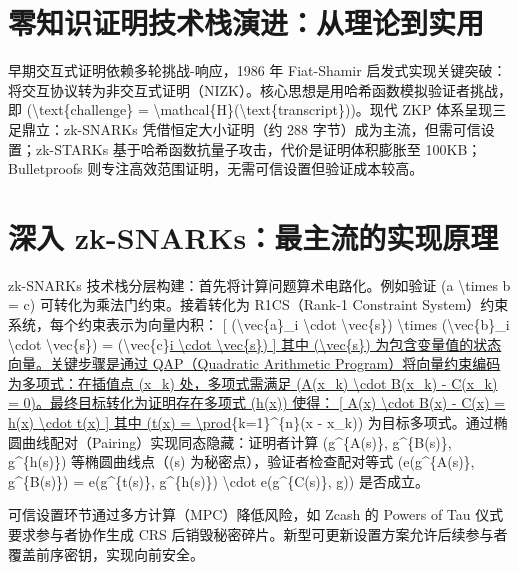 \chapter{零知识证明技术栈演进：从理论到实用}
早期交互式证明依赖多轮挑战-响应，1986 年 Fiat-Shamir 启发式实现关键突破：将交互协议转为非交互式证明（NIZK）。核心思想是用哈希函数模拟验证者挑战，即 (\textbackslash{}text\{{}challenge\}{} = \textbackslash{}mathcal\{{}H\}{}(\textbackslash{}text\{{}transcript\}{}))。现代 ZKP 体系呈现三足鼎立：zk-SNARKs 凭借恒定大小证明（约 288 字节）成为主流，但需可信设置；zk-STARKs 基于哈希函数抗量子攻击，代价是证明体积膨胀至 100KB；Bulletproofs 则专注高效范围证明，无需可信设置但验证成本较高。\par
\chapter{深入 zk-SNARKs：最主流的实现原理}
zk-SNARKs 技术栈分层构建：首先将计算问题算术电路化。例如验证 (a \textbackslash{}times b = c) 可转化为乘法门约束。接着转化为 R1CS（Rank-1 Constraint System）约束系统，每个约束表示为向量内积：
[
(\textbackslash{}vec\{{}a\}{}\_{}i \textbackslash{}cdot \textbackslash{}vec\{{}s\}{}) \textbackslash{}times (\textbackslash{}vec\{{}b\}{}\_{}i \textbackslash{}cdot \textbackslash{}vec\{{}s\}{}) = (\textbackslash{}vec\{{}c\}{}\underline{i \textbackslash{}cdot \textbackslash{}vec\{{}s\}{})
]
其中 (\textbackslash{}vec\{{}s\}{}) 为包含变量值的状态向量。关键步骤是通过 QAP（Quadratic Arithmetic Program）将向量约束编码为多项式：在插值点 (x\_{}k) 处，多项式需满足 (A(x\_{}k) \textbackslash{}cdot B(x\_{}k) - C(x\_{}k) = 0)。最终目标转化为证明存在多项式 (h(x)) 使得：
[
A(x) \textbackslash{}cdot B(x) - C(x) = h(x) \textbackslash{}cdot t(x)
]
其中 (t(x) = \textbackslash{}prod}\{{}k=1\}{}\^{}\{{}n\}{}(x - x\_{}k)) 为目标多项式。通过椭圆曲线配对（Pairing）实现同态隐藏：证明者计算 (g\^{}\{{}A(s)\}{}, g\^{}\{{}B(s)\}{}, g\^{}\{{}h(s)\}{}) 等椭圆曲线点（(s) 为秘密点），验证者检查配对等式 (e(g\^{}\{{}A(s)\}{}, g\^{}\{{}B(s)\}{}) = e(g\^{}\{{}t(s)\}{}, g\^{}\{{}h(s)\}{}) \textbackslash{}cdot e(g\^{}\{{}C(s)\}{}, g)) 是否成立。\par
可信设置环节通过多方计算（MPC）降低风险，如 Zcash 的 Powers of Tau 仪式要求参与者协作生成 CRS 后销毁秘密碎片。新型可更新设置方案允许后续参与者覆盖前序密钥，实现向前安全。\par
